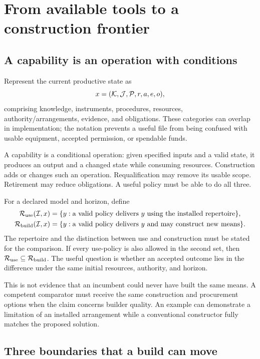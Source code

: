\section{From available tools to a construction frontier}
\label{sec:frontier}

\subsection{A capability is an operation with conditions}

Represent the current productive state as
\begin{equation}
x=(\mathcal{K},\mathcal J,\mathcal P,r,a,e,o),
\end{equation}
comprising knowledge, instruments, procedures, resources, authority/arrangements, evidence, and obligations. These categories can overlap in implementation; the notation prevents a useful file from being confused with usable equipment, accepted permission, or spendable funds.

A capability is a conditional operation: given specified inputs and a valid state, it produces an output and a changed state while consuming resources. Construction adds or changes such an operation. Requalification may remove its usable scope. Retirement may reduce obligations. A useful policy must be able to do all three.

For a declared model and horizon, define
\begin{align}
\mathcal{R}_{\mathrm{use}}(\mathcal{I},x)&=\{y:\text{a valid policy delivers $y$ using the installed repertoire}\},\\
\mathcal{R}_{\mathrm{build}}(\mathcal{I},x)&=\{y:\text{a valid policy delivers $y$ and may construct new means}\}.
\label{eq:frontiers}
\end{align}
The repertoire and the distinction between use and construction must be stated for the comparison. If every use-policy is also allowed in the second set, then $\mathcal{R}_{\mathrm{use}}\subseteq\mathcal{R}_{\mathrm{build}}$. The useful question is whether an accepted outcome lies in the difference under the same initial resources, authority, and horizon.

This is not evidence that an incumbent could never have built the same means. A competent comparator must receive the same construction and procurement options when the claim concerns builder quality. An example can demonstrate a limitation of an installed arrangement while a conventional constructor fully matches the proposed solution.

\subsection{Three boundaries that a build can move}

